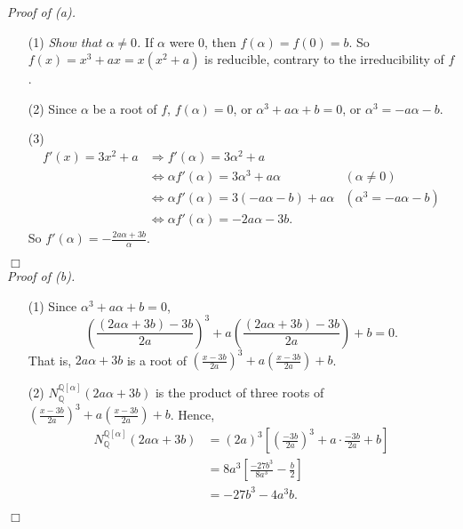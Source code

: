 \documentclass{article}
\begin{document}
\emph{Proof of (a).}
\begin{enumerate}
\item[(1)]
  \emph{Show that $\alpha \neq 0$.}
  If $\alpha$ were $0$, then $f(\alpha) = f(0) = b$.
  So $f(x) = x^3+ax = x(x^2+a)$ is reducible, contrary to the irreducibility of $f$.

\item[(2)]
  Since $\alpha$ be a root of $f$,
  $f(\alpha) = 0$,
  or $\alpha^3 + a\alpha + b = 0$,
  or $\alpha^3 = -a\alpha-b$.

\item[(3)]
  \begin{align*}
    f'(x) = 3x^2 + a
    &\Longrightarrow
    f'(\alpha) = 3\alpha^2 + a \\
    &\Longleftrightarrow
    \alpha f'(\alpha) = 3\alpha^3 + a\alpha
      &(\alpha \neq 0) \\
    &\Longleftrightarrow
    \alpha f'(\alpha) = 3(-a\alpha-b) + a\alpha
      &(\alpha^3 = -a\alpha-b) \\
    &\Longleftrightarrow
    \alpha f'(\alpha) = -2a\alpha-3b.
  \end{align*}
  So $f'(\alpha) = -\frac{2a\alpha+3b}{\alpha}$.
\end{enumerate}
$\Box$ \\



\emph{Proof of (b).}
\begin{enumerate}
\item[(1)]
  Since $\alpha^3 + a\alpha + b = 0$,
  \[
    \left( \frac{(2a\alpha+3b)-3b}{2a} \right)^3
    + a\left( \frac{(2a\alpha+3b)-3b}{2a} \right) + b = 0.
  \]
  That is, $2a\alpha+3b$ is a root of
  $\left( \frac{x-3b}{2a} \right)^3 + a\left( \frac{x-3b}{2a} \right) + b$.

\item[(2)]
  $N_{\mathbb{Q}}^{\mathbb{Q}[\alpha]}(2a\alpha+3b)$ is the product of three roots of
  $\left( \frac{x-3b}{2a} \right)^3 + a\left( \frac{x-3b}{2a} \right) + b$.
  Hence,
  \begin{align*}
    N_{\mathbb{Q}}^{\mathbb{Q}[\alpha]}(2a\alpha+3b)
    &= (2a)^3\left[ \left(\frac{-3b}{2a}\right)^3 + a \cdot \frac{-3b}{2a} + b \right] \\
    &= 8a^3\left[ \frac{-27b^3}{8a^3} - \frac{b}{2} \right] \\
    &= -27b^3-4a^3b.
  \end{align*}
\end{enumerate}
$\Box$ \\
\end{document}
